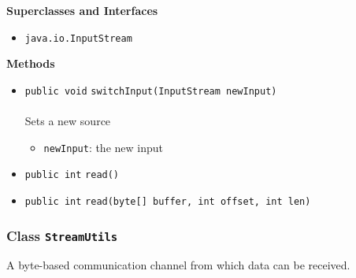 \textbf{\sffamily Superclasses and Interfaces}
\begin{itemize}
\item \lstinline|java.io.InputStream|
\end{itemize}



\textbf{\sffamily Methods}
\begin{itemize}
\item \lstinline|public void| \lstinline|switchInput|\lstinline|(InputStream newInput)|\\ \\[-0.6em]
Sets a new source
\begin{itemize}
\item \lstinline|newInput|: the new input
\end{itemize}



\item \lstinline|public int| \lstinline|read|\lstinline|()| \\[-0.6em]




\item \lstinline|public int| \lstinline|read|\lstinline|(byte[] buffer, int offset, int len)| \\[-0.6em]




\end{itemize}

\subsubsection{Class \lstinline|StreamUtils|}
A byte-based communication channel from which data can be received. \\
\noindent\begin{minipage}[t]{5cm}
\vspace{0.3em}
\hspace*{2em}
\vspace{0.3em}
\end{minipage}





